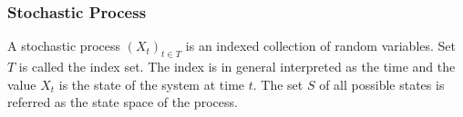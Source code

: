 \subsubsection*{Stochastic Process}
 A stochastic process $(X_t)_{t \in T}$ is an indexed collection of random variables. Set $T$ is called the index set. The index is in general interpreted as the time and the value $X_t$ is the state of the system at time $t$. The set $S$ of all possible states is referred as the state space of the process.